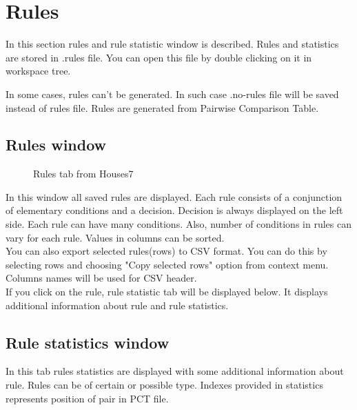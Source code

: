 \section{Rules}\label{section:rules}

In this section rules and rule statistic window is described. Rules and statistics are stored in .rules file. You can open this file by double clicking on it in workspace tree.

In some cases, rules can't be generated. In such case .no-rules file will be saved instead of rules file. Rules are generated from Pairwise Comparison Table.

\subsection{Rules window}\label{sub:rules}

\begin{figure*}[!ht] 
	\centering
	\caption{Rules tab from Houses7}
\end{figure*}

In this window all saved rules are displayed. Each rule consists of a conjunction of elementary conditions and a decision. Decision is always displayed on the left side. Each rule can have many conditions. Also, number of conditions in rules can vary for each rule. Values in columns can be sorted.\\

You can also export selected rules(rows) to CSV format. You can do this by selecting rows and choosing "Copy selected rows" option from context menu. Columns names will be used for CSV header.\\

If you click on the rule, rule statistic tab will be displayed below. It displays additional information about rule and rule statistics.

\subsection{Rule statistics window}\label{sub:rule-stat}

In this tab rules statistics are displayed with some additional information about rule.
Rules can be of certain or possible type. Indexes provided in statistics represents position of pair in PCT file.\\\\

